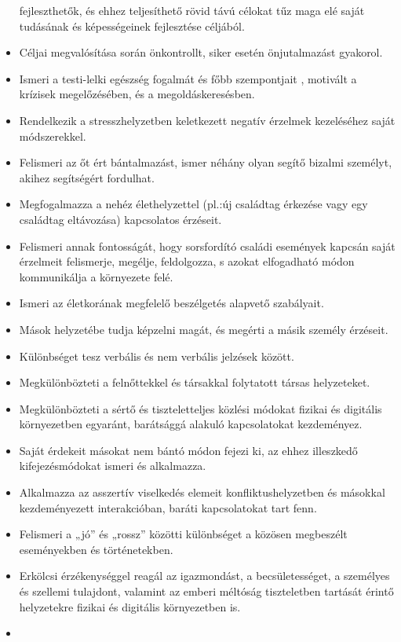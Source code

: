 \begin{itemize}
  fejleszthetők, és ehhez teljesíthető rövid távú célokat tűz maga elé
  saját tudásának és képességeinek fejlesztése céljából.
\item
  Céljai megvalósítása során önkontrollt, siker esetén önjutalmazást
  gyakorol.
\item
  Ismeri a testi-lelki egészség fogalmát és főbb szempontjait , motivált
  a krízisek megelőzésében, és a megoldáskeresésben.
\item
  Rendelkezik a stresszhelyzetben keletkezett negatív érzelmek
  kezeléséhez saját módszerekkel.
\item
  Felismeri az őt ért bántalmazást, ismer néhány olyan segítő bizalmi
  személyt, akihez segítségért fordulhat.
\item
  Megfogalmazza a nehéz élethelyzettel (pl.:új családtag érkezése vagy
  egy családtag eltávozása) kapcsolatos érzéseit.
\item
  Felismeri annak fontosságát, hogy sorsfordító családi események
  kapcsán saját érzelmeit felismerje, megélje, feldolgozza, s azokat
  elfogadható módon kommunikálja a környezete felé.
\item
  Ismeri az életkorának megfelelő beszélgetés alapvető szabályait.
\item
  Mások helyzetébe tudja képzelni magát, és megérti a másik személy
  érzéseit.
\item
  Különbséget tesz verbális és nem verbális jelzések között.
\item
  Megkülönbözteti a felnőttekkel és társakkal folytatott társas
  helyzeteket.
\item
  Megkülönbözteti a sértő és tiszteletteljes közlési módokat fizikai és
  digitális környezetben egyaránt, barátsággá alakuló kapcsolatokat
  kezdeményez.
\item
  Saját érdekeit másokat nem bántó módon fejezi ki, az ehhez illeszkedő
  kifejezésmódokat ismeri és alkalmazza.
\item
  Alkalmazza az asszertív viselkedés elemeit konfliktushelyzetben és
  másokkal kezdeményezett interakcióban, baráti kapcsolatokat tart fenn.
\item
  Felismeri a „jó'' és „rossz'' közötti különbséget a közösen megbeszélt
  eseményekben és történetekben.
\item
  Erkölcsi érzékenységgel reagál az igazmondást, a becsületességet, a
  személyes és szellemi tulajdont, valamint az emberi méltóság
  tiszteletben tartását érintő helyzetekre fizikai és digitális
  környezetben is.
\item

\end{itemize}
